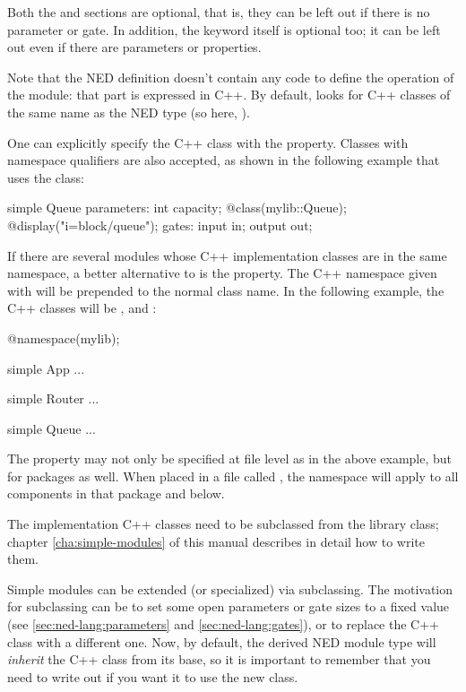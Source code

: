 Both the  and  sections are optional, that is,
they can be left out if there is no parameter or gate. In addition, the
 keyword itself is optional too; it can be left out
even if there are parameters or properties.

Note that the NED definition doesn't contain any code to define the
operation of the module: that part is expressed in C++. By default, {\opp}
looks for C++ classes of the same name as the NED type (so here, ).

One can explicitly specify the C++ class with the  property.
Classes with namespace qualifiers are also accepted, as shown in the following
example that uses the  class:

\begin{ned}
simple Queue
{
    parameters:
        int capacity;
        @class(mylib::Queue);
        @display("i=block/queue");
    gates:
        input in;
        output out;
}
\end{ned}

If there are several modules whose C++ implementation classes are in the same
namespace, a better alternative to  is the  property.
The C++ namespace given with  will be prepended to the normal
class name. In the following example, the C++ classes will be ,
 and :

\begin{ned}
@namespace(mylib);

simple App {
   ...
}

simple Router {
   ...
}

simple Queue {
   ...
}
\end{ned}

The  property may not only be specified at file level as
in the above example, but for packages as well. When placed in a file
called , the namespace will apply to all components in
that package and below.

The implementation C++ classes need to be subclassed from the
 library class; chapter \ref{cha:simple-modules} of
this manual describes in detail how to write them.

Simple modules can be extended (or specialized) via subclassing. The
motivation for subclassing can be to set some open parameters or gate sizes
to a fixed value (see \ref{sec:ned-lang:parameters} and
\ref{sec:ned-lang:gates}), or to replace the C++ class with a different
one. Now, by default, the derived NED module type will \textit{inherit} the
C++ class from its base, so it is important to remember that you need to
write out  if you want it to use the new class.

